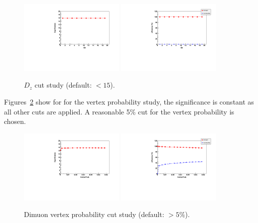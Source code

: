\begin{figure}[h!]
 \begin{center}
   \includegraphics[angle=0,width=0.45\textwidth]{chap_YInPbPbColl2011_figures/Dz_Significance1} 
   \includegraphics[angle=0,width=0.45\textwidth]{chap_YInPbPbColl2011_figures/Dz_SigBkgRejEff}
   \caption{$D_{z}$ cut study  (default: $<15$).} %
   \label{fig:mu_Dz}
 \end{center}
\end{figure}

Figures~\ref{fig:mu_vprob} show for for the vertex probability study, the significance is constant 
as all other cuts are applied. A reasonable 5\% cut for the vertex probability is chosen.
%
\begin{figure}[h!]
 \begin{center}
   \includegraphics[angle=0,width=0.45\textwidth]{chap_YInPbPbColl2011_figures/VProb_Significance1} 
   \includegraphics[angle=0,width=0.45\textwidth]{chap_YInPbPbColl2011_figures/VProb_SigBkgRejEff}
   \caption{Dimuon vertex probability cut study  (default: $>5\%$).}
   \label{fig:mu_vprob}
 \end{center}
\end{figure}

